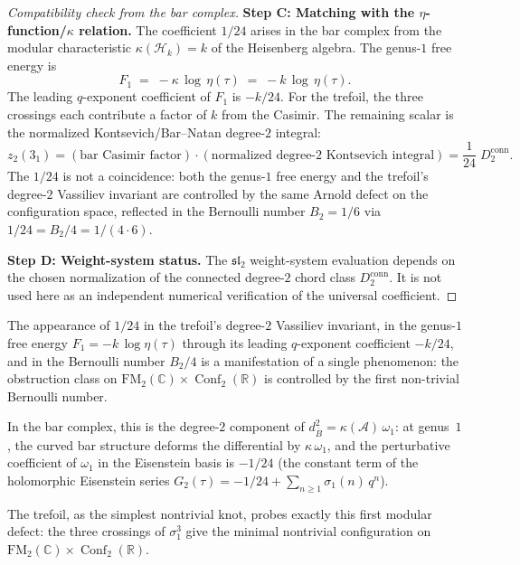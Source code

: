 \documentclass[11pt]{article}
\newcommand{\cA}{\mathcal{A}}
\newcommand{\cH}{\mathcal{H}}
\newcommand{\fsl}{\mathfrak{sl}}
\newcommand{\barB}{\overline{B}}
\newcommand{\C}{\mathbb{C}}
\newcommand{\R}{\mathbb{R}}
\newcommand{\FM}{\mathrm{FM}}
\DeclareMathOperator{\Conf}{Conf}
\begin{document}
\begin{proof}[Compatibility check from the bar complex]
\medskip
\noindent\textbf{Step C: Matching with the
$\eta$-function/$\kappa$ relation.}
The coefficient $1/24$ arises in the bar complex from the
modular characteristic $\kappa(\cH_k) = k$ of the Heisenberg
algebra.  The genus-$1$ free energy is
\[
  F_1
  \;=\;
  -\kappa\,\log\,\eta(\tau)
  \;=\;
  -k\,\log\,\eta(\tau).
\]
The leading $q$-exponent coefficient of $F_1$ is $-k/24$.  For
the trefoil, the three crossings each contribute a factor of $k$
from the Casimir.  The remaining scalar is the normalized
Kontsevich/Bar--Natan degree-$2$ integral:
\[
  z_2(3_1) =
  (\text{bar Casimir factor}) \cdot
  (\text{normalized degree-$2$ Kontsevich integral})
  = \frac{1}{24}\;D_2^{\mathrm{conn}}.
\]
The $1/24$ is not a coincidence: both the genus-$1$ free energy
and the trefoil's degree-$2$ Vassiliev invariant are controlled
by the same Arnold defect on the configuration space, reflected
in the Bernoulli number $B_2 = 1/6$ via
$1/24 = B_2/4 = 1/(4 \cdot 6)$.

\medskip
\noindent\textbf{Step D: Weight-system status.}
The $\fsl_2$ weight-system evaluation depends on the chosen
normalization of the connected degree-$2$ chord class
$D_2^{\mathrm{conn}}$.  It is not used here as an independent
numerical verification of the universal coefficient.
\end{proof}

\begin{remark}
\label{rem:1-24-dedekind}
The appearance of $1/24$ in the trefoil's degree-$2$
Vassiliev invariant, in the genus-$1$ free energy
$F_1=-k\,\log\eta(\tau)$ through its leading $q$-exponent
coefficient $-k/24$, and in the Bernoulli number $B_2/4$ is a
manifestation of a single phenomenon:
the obstruction class on $\FM_2(\C) \times \Conf_2(\R)$
is controlled by the first non-trivial Bernoulli number.

In the bar complex, this is the degree-$2$ component of
$d_{\barB}^2 = \kappa(\cA)\,\omega_1$: at genus~$1$, the
curved bar structure deforms the differential by $\kappa\,\omega_1$,
and the perturbative coefficient of $\omega_1$ in the Eisenstein
basis is $-1/24$ (the constant term of the holomorphic
Eisenstein series $G_2(\tau) = -1/24 + \sum_{n \ge 1}
\sigma_1(n)\,q^n$).

The trefoil, as the simplest nontrivial knot, probes exactly
this first modular defect: the three crossings of $\sigma_1^3$
give the minimal nontrivial configuration on
$\FM_2(\C) \times \Conf_2(\R)$.
\end{remark}
\end{document}
